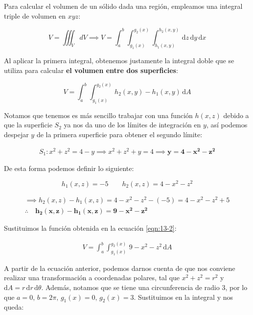 \documentclass[12pt]{article}
\begin{document}
\noindent Para calcular el volumen de un sólido dada una región, empleamos una integral triple de volumen en $xyz$:

\begin{equation}\label{eqn:13-1}\tag{1}
	V = \iiint_V dV \implies V = \int_{a}^{b}\int_{g_1(x)}^{g_2(x)}\int_{h_1(x,y)}^{h_2(x,y)}\, \mathrm{d}z\,\mathrm{d}y\,\mathrm{d}x
\end{equation}

\noindent Al aplicar la primera integral, obtenemos justamente la integral doble que se utiliza para calcular \textbf{el volumen entre dos superficies}:

\begin{equation}\label{eqn:13-2}\tag{2}
	V = \int_{a}^{b}\int_{g_1(x)}^{g_2(x)}\, h_2(x,y)-h_1(x,y)\, \mathrm{d}A
\end{equation}

\noindent Notamos que tenemos es más sencillo trabajar con una función $h(x,z)$ debido a que la superficie $S_2$ ya nos da uno de los límites de integración en $y$, así podemos despejar $y$ de la primera superficie para obtener el segundo límite:

\begin{align*}
	S_1:x^2+z^2=4-y \implies x^2+z^2+y=4 \implies \boldsymbol{y=4-x^2-z^2}
\end{align*}

\noindent De esta forma podemos definir lo siguiente:

\begin{equation*}
	h_1(x,z) = -5 \qquad
	h_2(x,z) = 4-x^2-z^2
\end{equation*}

\begin{align*}
	\implies h_2(x,z) - h_1(x,z) = 4-x^2-z^2 - (-5) = 4-x^2-z^2 + 5\\
	\therefore \quad \boldsymbol{h_2(x,z) - h_1(x,z) = 9-x^2-z^2}
\end{align*}

\noindent Sustituimos la función obtenida en la ecuación \eqref{eqn:13-2}:

\begin{align*}
	V = \int_{a}^{b}\int_{g_1(x)}^{g_2(x)}\, 9-x^2-z^2\, \mathrm{d}A
\end{align*}

\noindent A partir de la ecuación anterior, podemos darnos cuenta de que nos conviene realizar una transformación a coordenadas polares, tal que $x^2+z^2 = r^2$ y $\mathrm{d}A = r\, \mathrm{d}r\,\mathrm{d}\theta
$. Además, notamos que se tiene una circunferencia de radio 3, por lo que $a=0,\, b=2\pi,\, g_1(x)=0,\, g_2(x)=3$. Sustituimos en la integral y nos queda:
\end{document}
